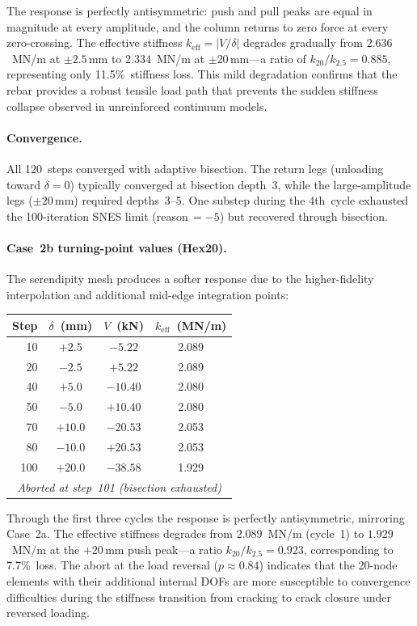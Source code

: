 \noindent
The response is perfectly antisymmetric: push and pull peaks are
equal in magnitude at every amplitude, and the column returns to
zero force at every zero-crossing.  The effective stiffness
$k_{\text{eff}} = |V/\delta|$ degrades gradually from $2.636$~MN/m
at $\pm 2.5$\,mm to $2.334$~MN/m at $\pm 20$\,mm---a ratio of
$k_{20}/k_{2.5} = 0.885$, representing only 11.5\%~stiffness loss.
This mild degradation confirms that the rebar provides a robust
tensile load path that prevents the sudden stiffness collapse
observed in unreinforced continuum models.

\paragraph{Convergence.}
All 120~steps converged with adaptive bisection.  The return legs
(unloading toward $\delta = 0$) typically converged at bisection
depth~3, while the large-amplitude legs ($\pm 20$\,mm) required
depths~3--5.  One substep during the 4th~cycle exhausted the
100-iteration SNES limit (reason\,$= -5$) but recovered through
bisection.

\paragraph{Case~2b turning-point values (Hex20).}
The serendipity mesh produces a softer response due to the
higher-fidelity interpolation and additional mid-edge integration
points:

\begin{center}
\begin{tabular}{rccc}
\toprule
\textbf{Step} & $\delta$~(mm) & $V$~(kN) & $k_{\text{eff}}$~(MN/m) \\
\midrule
 10 & $+2.5$  & $-5.22$  & 2.089 \\
 20 & $-2.5$  & $+5.22$  & 2.089 \\
 40 & $+5.0$  & $-10.40$ & 2.080 \\
 50 & $-5.0$  & $+10.40$ & 2.080 \\
 70 & $+10.0$ & $-20.53$ & 2.053 \\
 80 & $-10.0$ & $+20.53$ & 2.053 \\
100 & $+20.0$ & $-38.58$ & 1.929 \\
\multicolumn{4}{c}{\textit{Aborted at step~101 (bisection exhausted)}} \\
\bottomrule
\end{tabular}
\end{center}

\noindent
Through the first three cycles the response is perfectly
antisymmetric, mirroring Case~2a.  The effective stiffness
degrades from $2.089$~MN/m (cycle~1) to $1.929$~MN/m at the
$+20$\,mm push peak---a ratio $k_{20}/k_{2.5} = 0.923$,
corresponding to 7.7\%~loss.  The abort at the load reversal
($p \approx 0.84$) indicates that the 20-node elements with their
additional internal DOFs are more susceptible to convergence
difficulties during the stiffness transition from cracking to
crack closure under reversed loading.

